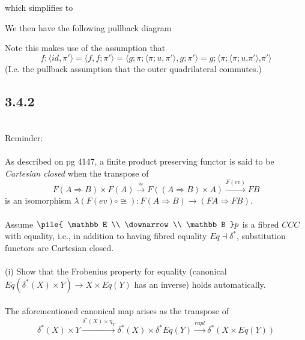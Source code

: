 \documentclass{article}
\newcommand{\vrt}[2]{
\pile{
#1 \\
\downarrow \\
#2
}
}
\begin{document}
which simplifies to
\begin{center}
\end{center}
We then have the following pullback diagram

\begin{center}
\end{center}
Note this makes use of the assumption that 
$$f;\langle id, \pi' \rangle = \langle f, f;\pi' \rangle = \langle g;\pi;\langle \pi;u, \pi' \rangle, g;\pi' \rangle
= g;\langle \pi; \langle \pi;u \text{,} \pi' \rangle \text{,} \pi' \rangle$$
(I.e. the pullback assumption that the outer quadrilateral commutes.) 

\subsection*{3.4.2}~\\
Reminder:\\~\\
As described on pg 4147, a finite product preserving functor is said to be \emph{Cartesian closed} when
the transpose of
$$ F(A \Rightarrow B) \times F(A) \overset{\cong}{\longrightarrow} F((A \Rightarrow B) \times A) \overset{F(ev)}{\longrightarrow} FB$$
is an isomorphism $\lambda(F(ev) \circ \cong) : F(A \Rightarrow B) \to (FA \Rightarrow FB)$.\\~\\
Assume $\vrt{\mathbb E}{\mathbb B}p$ is a fibred $CCC$ with equality, i.e., in addition to having fibred 
equality $Eq \dashv \delta^*$, substitution functors are Cartesian closed.\\~\\
(i) Show that the Frobenius property for equality (canonical $Eq(\delta^*(X) \times Y) \longrightarrow X \times Eq(Y)$ has an inverse) holds automatically.\\~\\
The aforementioned canonical map arises as the transpose of 
$$\delta^*(X) \times Y \overset{\delta^*(X) \times \eta_Y}{\longrightarrow} \delta^*(X) \times \delta^*Eq(Y) 
  \overset{rapl}{\longrightarrow} \delta^*(X \times Eq(Y)) $$
\end{document}
